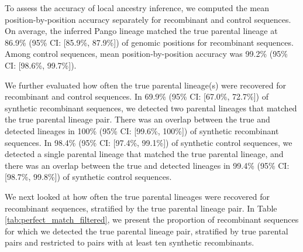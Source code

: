 \documentclass[11pt,oneside,letterpaper]{article}
\begin{document}
To assess the accuracy of local ancestry inference, we computed the mean position-by-position accuracy separately for recombinant and control sequences. On average, the inferred Pango lineage matched the true parental lineage at 86.9\% (95\% CI: [85.9\%, 87.9\%]) of genomic positions for recombinant sequences. Among control sequences, mean position-by-position accuracy was 99.2\% (95\% CI: [98.6\%, 99.7\%]).

We further evaluated how often the true parental lineage(s) were recovered for recombinant and control sequences. In 69.9\% (95\% CI: [67.0\%, 72.7\%]) of synthetic recombinant sequences, we detected two parental lineages that matched the true parental lineage pair. There was an overlap between the true and detected lineages in 100\% (95\% CI: [99.6\%, 100\%]) of synthetic recombinant sequences. In 98.4\% (95\% CI: [97.4\%, 99.1\%]) of synthetic control sequences, we detected a single parental lineage that matched the true parental lineage, and there was an overlap between the true and detected lineages in 99.4\% (95\% CI: [98.7\%, 99.8\%]) of synthetic control sequences.

We next looked at how often the true parental lineages were recovered for recombinant sequences, stratified by the true parental lineage pair. In Table \ref{tab:perfect_match_filtered}, we present the proportion of recombinant sequences for which we detected the true parental lineage pair, stratified by true parental pairs and restricted to pairs with at least ten synthetic recombinants.
\end{document}
